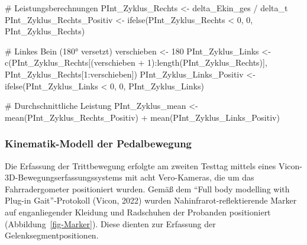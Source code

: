 \documentclass[
  letterpaper,
  DIV=11]{scrartcl}
\newenvironment{Shaded}{\begin{snugshade}}{\end{snugshade}}
\newcommand{\CommentTok}[1]{\textcolor[rgb]{0.37,0.37,0.37}{#1}}
\newcommand{\DecValTok}[1]{\textcolor[rgb]{0.68,0.00,0.00}{#1}}
\newcommand{\FunctionTok}[1]{\textcolor[rgb]{0.28,0.35,0.67}{#1}}
\newcommand{\NormalTok}[1]{\textcolor[rgb]{0.00,0.23,0.31}{#1}}
\newcommand{\OtherTok}[1]{\textcolor[rgb]{0.00,0.23,0.31}{#1}}
\newcommand{\SpecialCharTok}[1]{\textcolor[rgb]{0.37,0.37,0.37}{#1}}
\begin{document}
\begin{Shaded}
\begin{Highlighting}[]
\CommentTok{\# Leistungsberechnungen}
\NormalTok{PInt\_Zyklus\_Rechts }\OtherTok{\textless{}{-}}\NormalTok{ delta\_Ekin\_ges }\SpecialCharTok{/}\NormalTok{ delta\_t}
\NormalTok{PInt\_Zyklus\_Rechts\_Positiv }\OtherTok{\textless{}{-}} \FunctionTok{ifelse}\NormalTok{(PInt\_Zyklus\_Rechts }\SpecialCharTok{\textless{}} \DecValTok{0}\NormalTok{, }\DecValTok{0}\NormalTok{, PInt\_Zyklus\_Rechts)}

\CommentTok{\# Linkes Bein (180° versetzt)}
\NormalTok{verschieben }\OtherTok{\textless{}{-}} \DecValTok{180}
\NormalTok{PInt\_Zyklus\_Links }\OtherTok{\textless{}{-}} \FunctionTok{c}\NormalTok{(PInt\_Zyklus\_Rechts[(verschieben }\SpecialCharTok{+} \DecValTok{1}\NormalTok{)}\SpecialCharTok{:}\FunctionTok{length}\NormalTok{(PInt\_Zyklus\_Rechts)], }
\NormalTok{                       PInt\_Zyklus\_Rechts[}\DecValTok{1}\SpecialCharTok{:}\NormalTok{verschieben])}
\NormalTok{PInt\_Zyklus\_Links\_Positiv }\OtherTok{\textless{}{-}} \FunctionTok{ifelse}\NormalTok{(PInt\_Zyklus\_Links }\SpecialCharTok{\textless{}} \DecValTok{0}\NormalTok{, }\DecValTok{0}\NormalTok{, PInt\_Zyklus\_Links)}

\CommentTok{\# Durchschnittliche Leistung}
\NormalTok{PInt\_Zyklus\_mean }\OtherTok{\textless{}{-}} \FunctionTok{mean}\NormalTok{(PInt\_Zyklus\_Rechts\_Positiv) }\SpecialCharTok{+} \FunctionTok{mean}\NormalTok{(PInt\_Zyklus\_Links\_Positiv)}
\end{Highlighting}
\end{Shaded}

\subsubsection{Kinematik-Modell der
Pedalbewegung}\label{kinematik-modell-der-pedalbewegung}

Die Erfassung der Trittbewegung erfolgte am zweiten Testtag mittels
eines Vicon-3D-Bewegungserfassungssystems mit acht Vero-Kameras, die um
das Fahrradergometer positioniert wurden. Gemäß dem ``Full body
modelling with Plug-in Gait''-Protokoll (Vicon, 2022) wurden
Nahinfrarot-reflektierende Marker auf enganliegender Kleidung und
Radschuhen der Probanden positioniert (Abbildung~\ref{fig-Marker}).
Diese dienten zur Erfassung der Gelenksegmentpositionen.
\end{document}
